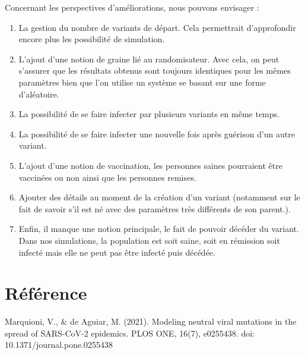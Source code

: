 \documentclass{article}
\begin{document}
Concernant les perspectives d'améliorations, nous pouvons envisager :
\begin{enumerate}
    \item La gestion du nombre de variants de départ. Cela permettrait d'approfondir encore plus les possibilité de simulation.
    \item L'ajout d'une notion de graine lié au randomisateur. Avec cela, on peut s'assurer que les résultats obtenus sont toujours identiques pour les mêmes paramètres bien que l'on utilise un système se basant sur une forme d'aléatoire.
    \item La possibilité de se faire infecter par plusieurs variants en même temps.
    \item La possibilité de se faire infecter une nouvelle fois après guérison d'un autre variant.
    \item L'ajout d'une notion de vaccination, les personnes saines pourraient être vaccinées ou non ainsi que les personnes remises.
    \item Ajouter des détails au moment de la création d'un variant (notamment sur le fait de savoir s'il est né avec des paramètres très différents de son parent.).
    \item Enfin, il manque une notion principale, le fait de pouvoir décéder du variant. Dans nos simulations, la population est soit saine, soit en rémission soit infecté mais elle ne peut pas être infecté puis décédée.
\end{enumerate}

\section{Référence}

Marquioni, V., & de Aguiar, M. (2021). Modeling neutral viral mutations in the spread of SARS-CoV-2 epidemics. PLOS ONE, 16(7), e0255438. doi: 10.1371/journal.pone.0255438
\end{document}
